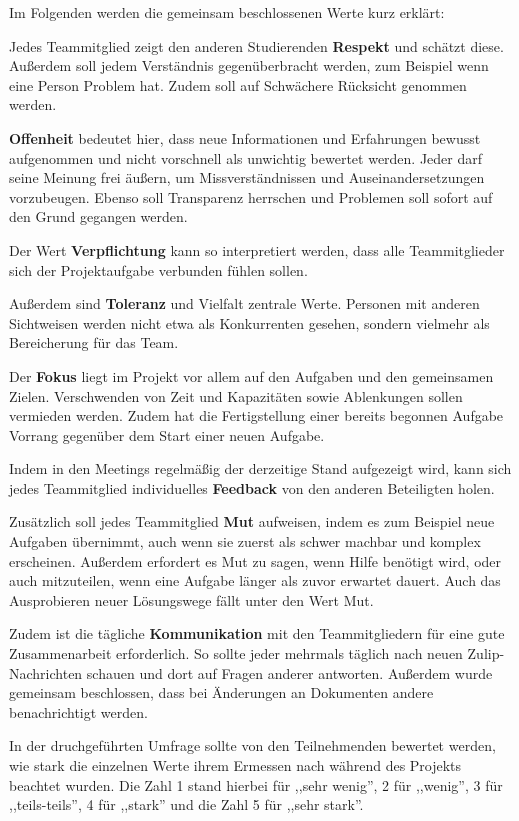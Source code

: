 \documentclass[../review_3.tex]{subfiles}
\begin{document}
Im Folgenden werden die gemeinsam beschlossenen Werte kurz erklärt:

Jedes Teammitglied zeigt den anderen Studierenden \textbf{Respekt} und schätzt diese. Außerdem soll jedem Verständnis gegenüberbracht werden, zum Beispiel wenn eine Person Problem hat. Zudem soll auf Schwächere Rücksicht genommen werden.

\textbf{Offenheit} bedeutet hier, dass neue Informationen und Erfahrungen bewusst aufgenommen und nicht vorschnell als unwichtig bewertet werden. Jeder darf seine Meinung frei äußern, um Missverständnissen und Auseinandersetzungen vorzubeugen. Ebenso soll Transparenz herrschen und Problemen soll sofort auf den Grund gegangen werden.

Der Wert \textbf{Verpflichtung} kann so interpretiert werden, dass alle Teammitglieder sich der Projektaufgabe verbunden fühlen sollen.

Außerdem sind \textbf{Toleranz} und Vielfalt zentrale Werte. Personen mit anderen Sichtweisen werden nicht etwa als Konkurrenten gesehen, sondern vielmehr als Bereicherung für das Team.

Der \textbf{Fokus} liegt im Projekt vor allem auf den Aufgaben und den gemeinsamen Zielen. Verschwenden von Zeit und Kapazitäten sowie Ablenkungen sollen vermieden werden. Zudem hat die Fertigstellung einer bereits begonnen Aufgabe Vorrang gegenüber dem Start einer neuen Aufgabe.

Indem in den Meetings regelmäßig der derzeitige Stand aufgezeigt wird, kann sich jedes Teammitglied individuelles \textbf{Feedback} von den anderen Beteiligten holen.

Zusätzlich soll jedes Teammitglied \textbf{Mut} aufweisen, indem es zum Beispiel neue Aufgaben übernimmt, auch wenn sie zuerst als schwer machbar und komplex erscheinen. Außerdem erfordert es Mut zu sagen, wenn Hilfe benötigt wird, oder auch mitzuteilen, wenn eine Aufgabe länger als zuvor erwartet dauert. Auch das Ausprobieren neuer Lösungswege fällt unter den Wert Mut.

Zudem ist die tägliche \textbf{Kommunikation} mit den Teammitgliedern für eine gute Zusammenarbeit erforderlich. So sollte jeder mehrmals täglich nach neuen Zulip-Nachrichten schauen und dort auf Fragen anderer antworten. Außerdem wurde gemeinsam beschlossen, dass bei Änderungen an Dokumenten andere benachrichtigt werden.

In der druchgeführten Umfrage sollte von den Teilnehmenden bewertet werden, wie stark die einzelnen Werte ihrem Ermessen nach während des Projekts beachtet wurden. Die Zahl 1 stand hierbei für ,,sehr wenig'', 2 für ,,wenig'', 3 für ,,teils-teils'', 4 für ,,stark'' und die Zahl 5 für ,,sehr stark''.
\end{document}
